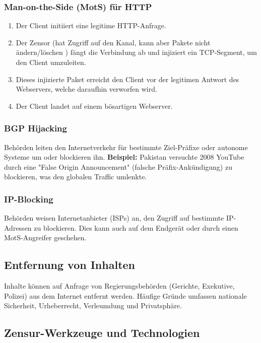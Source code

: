 \documentclass[
../../css_summary.tex,
]{subfiles}
\begin{document}
\subsubsection{Man-on-the-Side (MotS) für HTTP}
\begin{defbox}
  \begin{enumerate}
    \item Der Client initiiert eine legitime HTTP-Anfrage.
    \item Der Zensor (hat Zugriff auf den Kanal, kann aber Pakete nicht ändern/löschen ) fängt die Verbindung ab und injiziert ein TCP-Segment, um den Client umzuleiten.
    \item Dieses injizierte Paket erreicht den Client vor der legitimen Antwort des Webservers, welche daraufhin verworfen wird.
    \item Der Client landet auf einem bösartigen Webserver.
  \end{enumerate}
\end{defbox}

\subsubsection{BGP Hijacking}
Behörden leiten den Internetverkehr für bestimmte Ziel-Präfixe oder autonome Systeme um oder blockieren ihn.
\textbf{Beispiel:} Pakistan versuchte 2008 YouTube durch eine "False Origin Announcement" (falsche Präfix-Ankündigung) zu blockieren, was den globalen Traffic umlenkte.

\subsubsection{IP-Blocking}
Behörden weisen Internetanbieter (ISPs) an, den Zugriff auf bestimmte IP-Adressen zu blockieren. Dies kann auch auf dem Endgerät oder durch einen MotS-Angreifer geschehen.

\subsection{Entfernung von Inhalten}
Inhalte können auf Anfrage von Regierungsbehörden (Gerichte, Exekutive, Polizei) aus dem Internet entfernt werden. Häufige Gründe umfassen nationale Sicherheit, Urheberrecht, Verleumdung und Privatsphäre.

\subsection{Zensur-Werkzeuge und Technologien}
\end{document}
